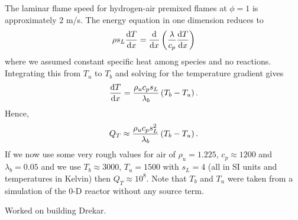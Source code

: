 The laminar flame speed for hydrogen-air premixed flames at $\phi = 1$ is approximately $2$ m/s.  The energy equation in one dimension reduces to
\begin{align}
  \rho s_{L}\frac{\mathrm{d} T}{\mathrm{d} x} = \frac{\mathrm{d} }{\mathrm{d} x}\left(\frac{\lambda}{c_{p}} \frac{\mathrm{d} T}{\mathrm{d} x}\right)
\end{align}
where we assumed constant specific heat among species and no reactions.  Integrating this from $T_{u}$ to $T_{b}$ and solving for the temperature gradient gives
\begin{align}
  \frac{\mathrm{d} T}{\mathrm{d} x} = \frac{\rho_{u}c_{p}s_{L}}{\lambda_{b}}\left(T_{b}-T_{u}\right).
\end{align}
Hence,
\begin{align}
  Q_{T} \approx \frac{\rho_{u}c_{p}s_{L}^{2}}{\lambda_{b}}\left(T_{b}-T_{u}\right).
\end{align}
If we now use some very rough values for air of $\rho_{u} = 1.225$, $c_{p} \approx 1200$ and $\lambda_{b}=0.05$ and we use $T_{b}\approx 3000$, $T_{u} = 1500$ with $s_{L}=4$ (all in SI units and temperatures in Kelvin) then $Q_{T}\approx 10^{8}$.  Note that $T_{b}$ and $T_{u}$ were taken from a simulation of the 0-D reactor without any source term.

Worked on building Drekar.


